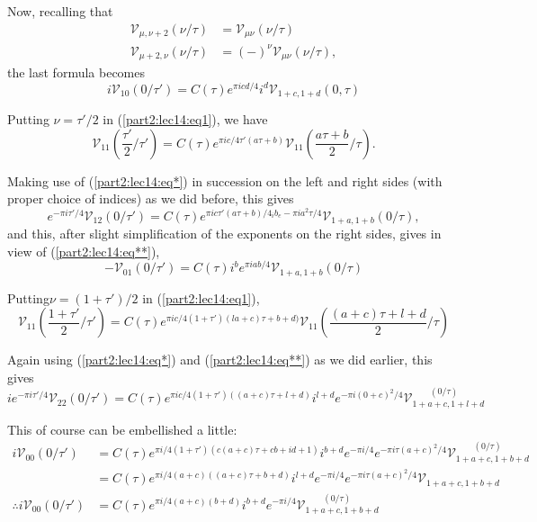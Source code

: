 Now, recalling that
\begin{equation*}
  \begin{aligned}
    \mathscr{V}_{\mu, \nu+2} (\nu/\tau) & = \mathscr{V}_{\mu \nu} (\nu/
    \tau)\\
    \mathscr{V}_{\mu+ 2, \nu} (\nu / \tau) & = (-)^\nu
    \mathscr{V}_{\mu \nu} (\nu/\tau),
  \end{aligned}\tag{**}\label{part2:lec14:eq**}
\end{equation*}
the last formula becomes 
\begin{equation*}
  i \mathscr{V}_{10} (0/ \tau') = C(\tau) e^{\pi i cd/4} i^d
  \mathscr{V}_{1+ c, 1+d} (0, \tau) \tag{3}\label{part2:lec14:eq3}
\end{equation*}

Putting $\nu = \tau'/2$ in (\ref{part2:lec14:eq1}), we have 
$$
\mathscr{V}_{11} \left( \frac{\tau'}{2} \Big/ \tau'\right) = C(\tau)
e^{\pi i c/4 \tau'(a\tau+b)} \mathscr{V}_{11}
\left(\frac{a\tau+b}{2}\Big/ \tau\right).
$$

Making use of (\ref{part2:lec14:eq*}) in succession on the left and right sides (with
proper choice of indices) as we did before, this gives 
$$
e^{-\pi i \tau'/4} \mathscr{V}_{12} (0/ \tau') = C(\tau) e^{\pi i c
  \tau' (a \tau +b) /4_i b_e - \pi i a^2
  \tau/4} \mathscr{V}_{1+a, 1+b} (0/\tau),
$$
and this, after slight simplification of the exponents on the right
sides, gives in view of (\ref{part2:lec14:eq**}),
\begin{equation*}
  - \mathscr{V}_{01} (0/\tau') = C(\tau)i^b e^{\pi i ab/4}
  \mathscr{V}_{1+a, 1+b} (0/ \tau) \tag{4}\label{part2:lec14:eq4}
\end{equation*}

Putting\pageoriginale $\nu= (1+ \tau')/2$ in (\ref{part2:lec14:eq1}), 
$$
\mathscr{V}_{11} \left(\frac{1+\tau'}{2} \Big/ \tau'\right) = C(\tau)
e^{\pi i c/4(1+ \tau')(la+c) \tau+ b+d)} \mathscr{V}_{11}
\left(\frac{(a+c)\tau+l+d}{2}\Big/ \tau \right)
$$

Again using (\ref{part2:lec14:eq*}) and (\ref{part2:lec14:eq**}) as we
did earlier, this gives 
$$
i e^{- \pi i \tau' /4} \mathscr{V}_{22} (0/ \tau') = C(\tau)e^{\pi i
  c/4 (1+ \tau')((a+c)\tau+l+d)} i^{l+d} e^{- \pi i (0+ c)^2/4}
\mathscr{V}_{1+a+c, 1+l+d}^{\qquad(0/\tau)}
$$

This of course can be embellished a little:
\begin{align*}
  i \mathscr{V}_{00} (0/ \tau') & = C(\tau) e^{\pi i/4 (1+
    \tau')(c(a+c)\tau + cb+ id+1)} i^{b+d} e^{-\pi i/4} e^{- \pi i
    \tau (a+c)^2/4} \mathscr{V}_{1+a+c, 1+b+d}^{\qquad (0/\tau)}\\
  & = C(\tau) e^{\pi i /4(a+c)((a+c)\tau+b+d)} i^{l+d} e^{- \pi i/4}
  e^{- \pi i \tau (a+c)^2/4} \mathscr{V}_{1+a+c, 1+b+d}\\
  \therefore i \mathscr{V}_{00} (0/ \tau') & = C(\tau) e^{\pi i/4(a+c)
  (b+d)} i^{b+d} e^{-\pi i /4} \mathscr{V}_{1+a+c, 1+b+d}^{\qquad (0/
    \tau)}\tag{5}\label{part2:lec14:eq5} 
\end{align*}

